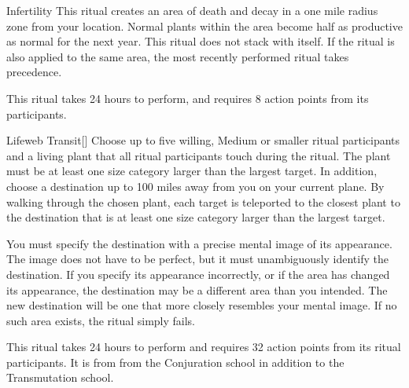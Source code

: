 \lowercase{\hypertarget{spell:Infertility}{}}\label{spell:Infertility}
\begin{apability}[\nth{2}]{\hypertarget{spell:Infertility}{Infertility}}
This ritual creates an area of death and decay in a one mile radius zone from your location.
Normal plants within the area become half as productive as normal for the next year.
This ritual does not stack with itself.
If the  ritual is also applied to the same area, the most recently performed ritual takes precedence.

This ritual takes 24 hours to perform, and requires 8 action points from its participants.
\end{apability}
\vspace{0.25em}



\lowercase{\hypertarget{spell:Lifeweb Transit}{}}\label{spell:Lifeweb Transit}
\begin{apability}[\nth{4}]{\hypertarget{spell:Lifeweb Transit}{Lifeweb Transit}}[]
Choose up to five willing, Medium or smaller ritual participants and a living plant that all ritual participants touch during the ritual.
The plant must be at least one size category larger than the largest target.
In addition, choose a destination up to 100 miles away from you on your current plane.
By walking through the chosen plant, each target is teleported to the closest plant to the destination that is at least one size category larger than the largest target.

You must specify the destination with a precise mental image of its appearance.
The image does not have to be perfect, but it must unambiguously identify the destination.
If you specify its appearance incorrectly, or if the area has changed its appearance, the destination may be a different area than you intended.
The new destination will be one that more closely resembles your mental image.
If no such area exists, the ritual simply fails.

This ritual takes 24 hours to perform and requires 32 action points from its ritual participants.
It is from from the Conjuration school in addition to the Transmutation school.
\end{apability}
\vspace{0.25em}


